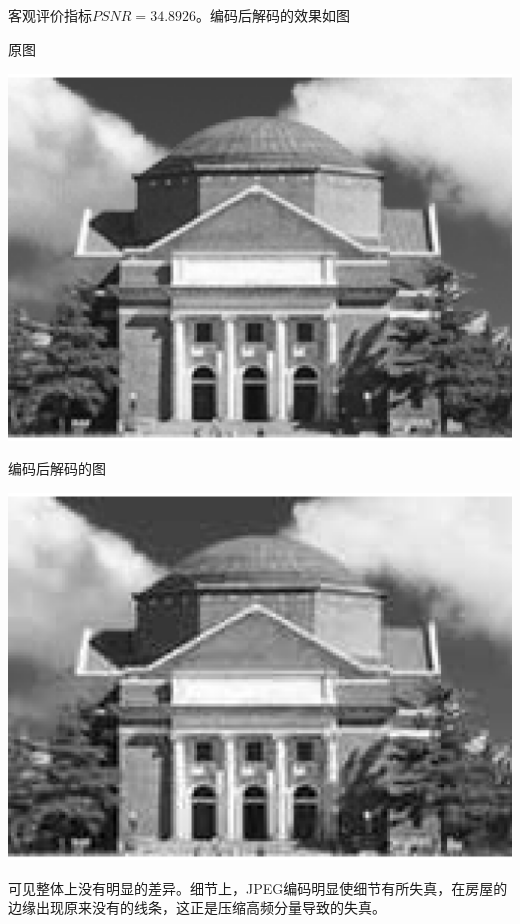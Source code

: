 \documentclass{article}
\begin{document}
\subsection{}
\noindent{}
\par 客观评价指标$PSNR=34.8926$。编码后解码的效果如图
\par 原图
\begin{center}\includegraphics[width=\textwidth]{original.eps}\end{center}
\par 编码后解码的图
\begin{center}\includegraphics[width=\textwidth]{fullqtab.eps}\end{center}
\par 可见整体上没有明显的差异。细节上，JPEG编码明显使细节有所失真，在房屋的边缘出现原来没有的线条，这正是压缩高频分量导致的失真。
\end{document}
